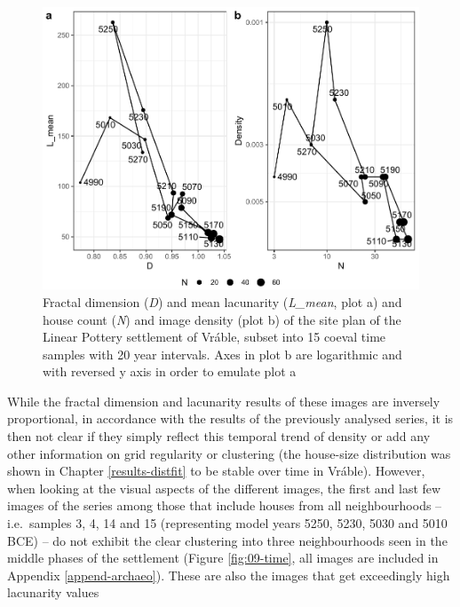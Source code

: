 \documentclass[
  12pt,
  a4paper, twoside]{book}
\begin{document}
\begin{figure}

{\centering \includegraphics[width=0.9\linewidth]{bookdown-demo_files/figure-latex/09-time-points-1} 

}

\caption[D and L\_mean, N and density of temporal sample images of Vráble]{Fractal dimension (\emph{D}) and mean lacunarity (\emph{L\_mean}, plot a) and house count (\emph{N}) and image density (plot b) of the site plan of the Linear Pottery settlement of Vráble, subset into 15 coeval time samples with 20 year intervals. Axes in plot b are logarithmic and with reversed y axis in order to emulate plot a}\label{fig:09-time-points}
\end{figure}

While the fractal dimension and lacunarity results of these images are inversely proportional, in accordance with the results of the previously analysed series, it is then not clear if they simply reflect this temporal trend of density or add any other information on grid regularity or clustering (the house-size distribution was shown in Chapter \ref{results-distfit} to be stable over time in Vráble). However, when looking at the visual aspects of the different images, the first and last few images of the series among those that include houses from all neighbourhoods -- i.e.~samples 3, 4, 14 and 15 (representing model years 5250, 5230, 5030 and 5010 BCE) -- do not exhibit the clear clustering into three neighbourhoods seen in the middle phases of the settlement (Figure \ref{fig:09-time}, all images are included in Appendix \ref{append-archaeo}). These are also the images that get exceedingly high lacunarity values
\end{document}
